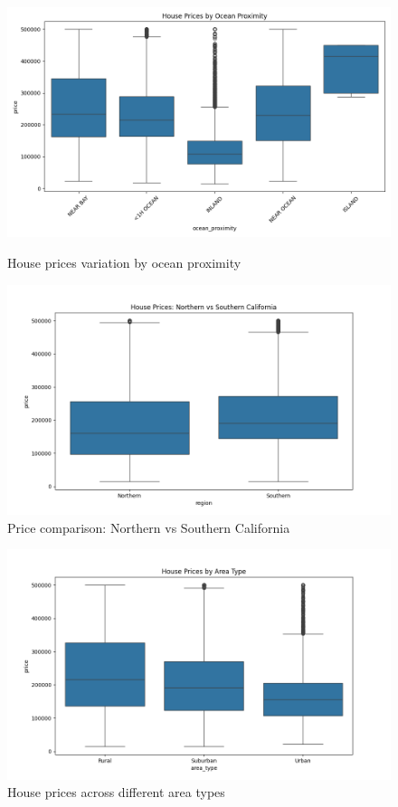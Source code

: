 \documentclass[a4paper, 11pt]{article}
\begin{document}
\begin{figure}[h]
    \centering
    \begin{minipage}{0.48\textwidth}
        \includegraphics[width=\linewidth]{figs/price_by_ocean.png}
        \caption{House prices variation by ocean proximity}
        \label{fig:price_ocean}
    \end{minipage}
    \hfill
    \begin{minipage}{0.48\textwidth}
        \includegraphics[width=\linewidth]{figs/price_by_region.png}
        \caption{Price comparison: Northern vs Southern California}
        \label{fig:price_region}
    \end{minipage}
\end{figure}

\begin{figure}[h]
    \centering
    \includegraphics[scale=0.5]{figs/price_by_area_type.png}
    \caption{House prices across different area types}
    \label{fig:price_area}
\end{figure}
\end{document}
